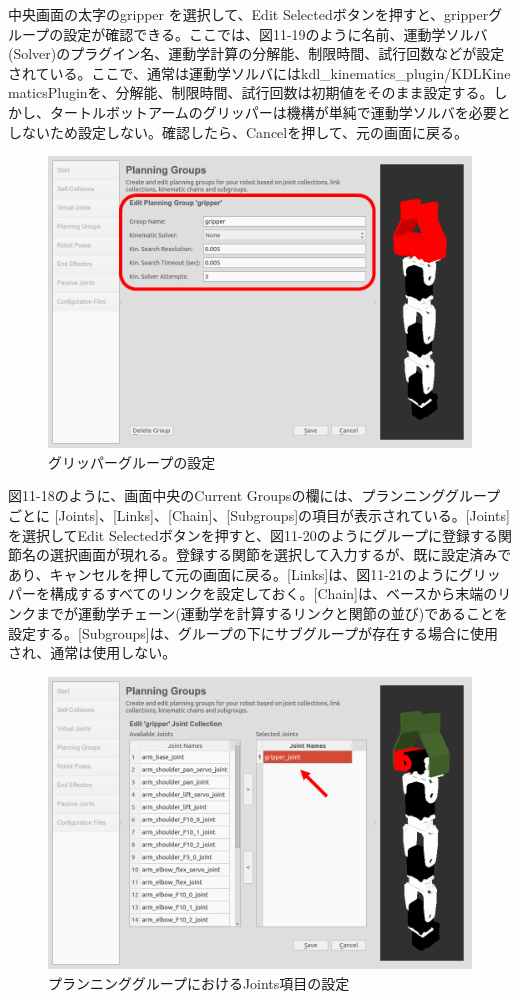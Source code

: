 中央画面の太字のgripper を選択して、Edit Selectedボタンを押すと、gripperグループの設定が確認できる。ここでは、図11-19のように名前、運動学ソルバ(Solver)のプラグイン名、運動学計算の分解能、制限時間、試行回数などが設定されている。ここで、通常は運動学ソルバにはkdl\_kinematics\_plugin/KDLKine\\maticsPluginを、分解能、制限時間、試行回数は初期値をそのまま設定する。しかし、タートルボットアームのグリッパーは機構が単純で運動学ソルバを必要としないため設定しない。確認したら、Cancelを押して、元の画面に戻る。

\begin{figure}[htp]
  \centering
  \includegraphics[width=12cm]{pictures/chapter11/pic_11_19.png}
  \caption{グリッパーグループの設定}
\end{figure}

図11-18のように、画面中央のCurrent Groupsの欄には、プランニンググループごとに [Joints]、[Links]、[Chain]、[Subgroups]の項目が表示されている。[Joints]を選択してEdit Selectedボタンを押すと、図11-20のようにグループに登録する関節名の選択画面が現れる。登録する関節を選択して入力するが、既に設定済みであり、キャンセルを押して元の画面に戻る。[Links]は、図11-21のようにグリッパーを構成するすべてのリンクを設定しておく。[Chain]は、ベースから末端のリンクまでが運動学チェーン(運動学を計算するリンクと関節の並び)であることを設定する。[Subgroups]は、グループの下にサブグループが存在する場合に使用され、通常は使用しない。

\begin{figure}[htp]
  \centering
  \includegraphics[width=12cm]{pictures/chapter11/pic_11_20.png}
  \caption{プランニンググループにおけるJoints項目の設定}
\end{figure}

